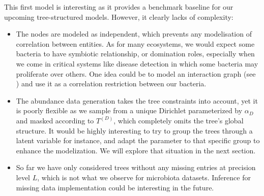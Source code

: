 This first model is interesting as it provides a benchmark baseline for our upcoming tree-structured models.
However, it clearly lacks of complexity:
\begin{itemize}
    \item The nodes are modeled as independent, which prevents any modelisation of correlation between entities.
          As for many ecosystems, we would expect some bacteria to have symbiotic relationship, or domination roles,
          especially when we come in critical systems like disease detection in which some bacteria may proliferate over others.
          One idea could be to model an interaction graph (see \cite{momal_tree}) and use it as a correlation restriction between our bacteria.
    \item The abundance data generation takes the tree constraints into account, yet it is poorly flexible as we sample from a unique Dirichlet
          parameterized by $\alpha_D$ and masked according to $T^{(D)}$, which completely omits the tree's global structure.
          It would be highly interesting to try to group the trees through a latent variable for instance, and adapt the parameter
          to that specific group to enhance the modelization.
          We will explore that situation in the next section.
    \item So far we have only considered trees without any missing entries at precision level $L$, which is not what we observe for microbiota datasets.
          Inference for missing data implementation could be interesting in the future.
\end{itemize}